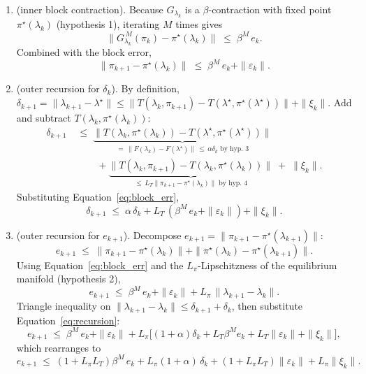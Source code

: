 \documentclass{article}
\begin{document}
\begin{enumerate}
    \item[Step 1] (inner block contraction). Because $G_{\lambda_k}$ is a $\beta$-contraction with fixed point $\pi^\star(\lambda_k)$ (hypothesis 1), iterating $M$ times gives
$$\|G_{\lambda_k}^{\,M}(\pi_k) - \pi^\star(\lambda_k)\| \;\le\; \beta^M\,e_k.$$
Combined with the block error,
\begin{equation}
\label{eq:block_err}
    \|\pi_{k+1} - \pi^\star(\lambda_k)\| \;\le\; \beta^M\,e_k + \|\varepsilon_k\|. \tag{A.12.1}
\end{equation}
    \item[Step 2] (outer recursion for $\delta_k$). By definition, $\delta_{k+1} = \|\lambda_{k+1} - \lambda^\star\| \le \|T(\lambda_k, \pi_{k+1}) - T(\lambda^\star, \pi^\star(\lambda^\star))\| + \|\xi_k\|$. Add and subtract $T(\lambda_k, \pi^\star(\lambda_k))$:
\begin{align*}
\delta_{k+1} \;&\le\; \underbrace{\|T(\lambda_k, \pi^\star(\lambda_k)) - T(\lambda^\star, \pi^\star(\lambda^\star))\|}_{=\,\|F(\lambda_k) - F(\lambda^\star)\|\,\le\,\alpha\delta_k\text{ by hyp.\ 3}} \\
&\qquad + \underbrace{\|T(\lambda_k, \pi_{k+1}) - T(\lambda_k, \pi^\star(\lambda_k))\|}_{\le\,L_T\|\pi_{k+1} - \pi^\star(\lambda_k)\|\text{ by hyp.\ 4}} \;+\; \|\xi_k\|.
\end{align*}
Substituting Equation~\ref{eq:block_err},
\begin{equation}
\label{eq:recursion}
\delta_{k+1} \;\le\; \alpha\,\delta_k + L_T\,(\beta^M\,e_k + \|\varepsilon_k\|) + \|\xi_k\|. \tag{A.12.2}
\end{equation}
    \item[Step 3] (outer recursion for $e_{k+1}$). Decompose $e_{k+1} = \|\pi_{k+1} - \pi^\star(\lambda_{k+1})\|$:
$$e_{k+1} \;\le\; \|\pi_{k+1} - \pi^\star(\lambda_k)\| + \|\pi^\star(\lambda_k) - \pi^\star(\lambda_{k+1})\|.$$
Using Equation~\ref{eq:block_err} and the $L_\pi$-Lipschitzness of the equilibrium manifold (hypothesis 2),
$$e_{k+1} \;\le\; \beta^M\,e_k + \|\varepsilon_k\| + L_\pi\,\|\lambda_{k+1} - \lambda_k\|.$$
Triangle inequality on $\|\lambda_{k+1} - \lambda_k\| \le \delta_{k+1} + \delta_k$, then substitute Equation~\ref{eq:recursion}:
$$e_{k+1} \;\le\; \beta^M\,e_k + \|\varepsilon_k\| + L_\pi\big[(1+\alpha)\delta_k + L_T\beta^M e_k + L_T\|\varepsilon_k\| + \|\xi_k\|\big],$$
which rearranges to
\begin{equation}
e_{k+1} \;\le\; (1+L_\pi L_T)\beta^M\,e_k + L_\pi(1+\alpha)\,\delta_k + (1+L_\pi L_T)\|\varepsilon_k\| + L_\pi\|\xi_k\|. \tag{A.12.3}

\end{equation}
\end{enumerate}
\end{document}

